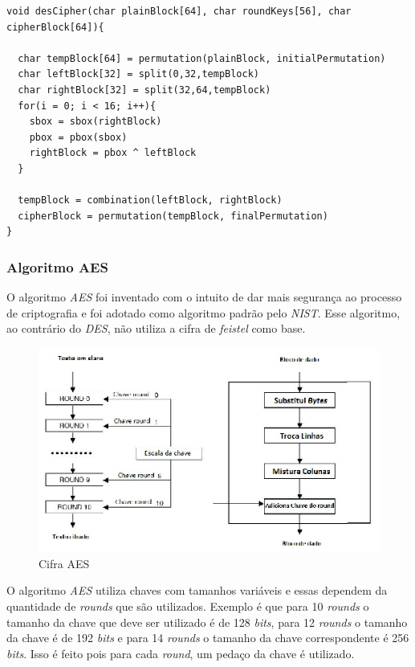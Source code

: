     \begin{lstlisting}[caption={Pseudo-código DES}, label=des-pseudo-code]
void desCipher(char plainBlock[64], char roundKeys[56], char cipherBlock[64]){

  char tempBlock[64] = permutation(plainBlock, initialPermutation)
  char leftBlock[32] = split(0,32,tempBlock)
  char rightBlock[32] = split(32,64,tempBlock)
  for(i = 0; i < 16; i++){
	sbox = sbox(rightBlock)  
	pbox = pbox(sbox)
	rightBlock = pbox ^ leftBlock
  }
  
  tempBlock = combination(leftBlock, rightBlock)
  cipherBlock = permutation(tempBlock, finalPermutation)
}
    \end{lstlisting}


\subsubsection{Algoritmo AES}

O algoritmo \textit{AES} foi inventado com o intuito de dar mais segurança ao processo de criptografia e foi adotado como algoritmo padrão pelo \textit{NIST}. Esse algoritmo, ao contrário do \textit{DES}, não utiliza a cifra de \textit{feistel} como base. 

\begin{figure}[h]
	\centering
	\includegraphics[scale=2]
		{figuras/aes_cipher.eps}
		\caption[Cifra\textit{AES}]{Cifra AES\protect\footnotemark} 
		\label{cifra-aes}
\end{figure}


O algoritmo \textit{AES} utiliza chaves com tamanhos variáveis e essas dependem da quantidade de \textit{rounds} que são utilizados. Exemplo é que para 10 \textit{rounds} o tamanho da chave que deve ser utilizado é de 128 \textit{bits}, para 12 \textit{rounds} o tamanho da chave é de 192 \textit{bits} e para 14 \textit{rounds} o tamanho da chave correspondente é 256 \textit{bits}. Isso é feito pois para cada \textit{round}, um pedaço da chave é utilizado.

